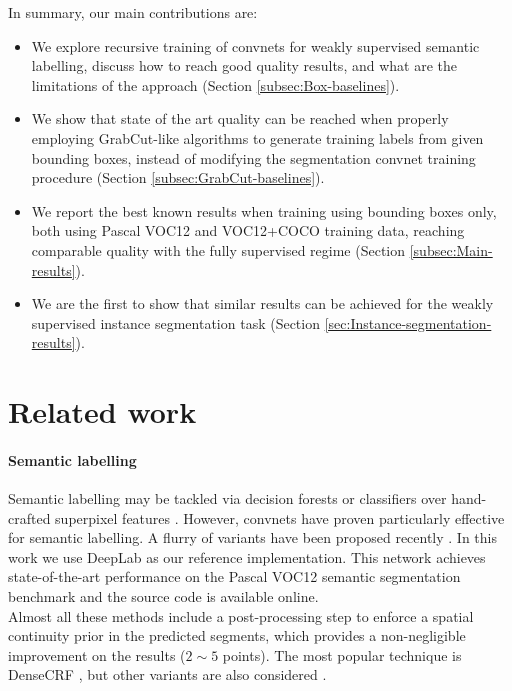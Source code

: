 \documentclass[10pt,english,british,twocolumn]{article}
\begin{document}
In summary, our main contributions are:
\begin{itemize}[label=$-$,itemsep=0em]
\item We explore recursive training of convnets for weakly supervised semantic
labelling, discuss how to reach good quality results, and what are
the limitations of the approach (Section \ref{subsec:Box-baselines}).
\item We show that state of the art quality can be reached when properly
employing GrabCut-like algorithms to generate training labels from
given bounding boxes, instead of modifying the segmentation convnet
training procedure (Section \ref{subsec:GrabCut-baselines}).
\item We report the best known results when training using bounding boxes
only, both using Pascal VOC12 and VOC12+COCO training data, reaching
comparable quality with the fully supervised regime (Section \ref{subsec:Main-results}).
\item We are the first to show that similar results can be achieved for
the weakly supervised instance segmentation task (Section \ref{sec:Instance-segmentation-results}).
\end{itemize}

\section{\label{subsec:Related-work}Related work}

\paragraph{Semantic labelling}

Semantic labelling may be tackled via decision forests \cite{Shotton2009Ijcv}
or classifiers over hand-crafted superpixel features \cite{Gould2009Iccv}.
However, convnets have proven particularly effective for semantic
labelling. A flurry of variants have been proposed recently \cite{Pinheiro2014Icml,Long2015Cvpr,Chen2015Iclr,Lin2016CvprAdelaide,Zheng2015IccvCrfAsRnn,Kokkinos2016Iclr,Yu2016Iclr}.
In this work we use Deep\-Lab \cite{Chen2015Iclr} as our reference
implementation. This network achieves state-of-the-art performance
on the Pascal VOC12 semantic segmentation benchmark and the source
code is available online. \\
Almost all these methods include a post-processing step to enforce
a spatial continuity prior in the predicted segments, which provides
a non-negligible improvement on the results ($2\!\sim\!5$ points).
The most popular technique is DenseCRF \cite{Kraehenbuehl2011Nips},
but other variants are also considered \cite{Kolmogorov2004Pami,Barron2015ArXiv}.
\vspace{-1em}
\end{document}
